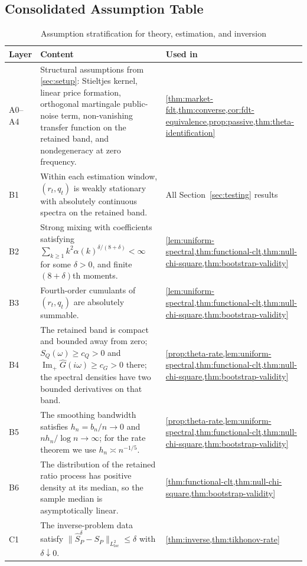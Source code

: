 \documentclass[11pt]{article}
\newcommand{\Ghat}{\widehat{G}}
\newcommand{\ImPart}{\operatorname{Im}_{\!+}}
\newcommand{\REV}{}
\begin{document}
\subsection{Consolidated Assumption Table}
\REV
\begin{table}[t]
\centering
\caption{Assumption stratification for theory, estimation, and inversion}
\begin{tabular}{>{\raggedright\arraybackslash}p{} >{\raggedright\arraybackslash}p{} >{\raggedright\arraybackslash}p{}}
\toprule
Layer & Content & Used in \\
\midrule
A0--A4 & Structural assumptions from \cref{sec:setup}: Stieltjes kernel, linear price formation, orthogonal martingale public-noise term, non-vanishing transfer function on the retained band, and nondegeneracy at zero frequency. & \cref{thm:market-fdt,thm:converse,cor:fdt-equivalence,prop:passive,thm:theta-identification} \\
B1 & Within each estimation window, $(r_t,q_t)$ is weakly stationary with absolutely continuous spectra on the retained band. & All Section~\ref{sec:testing} results \\
B2 & Strong mixing with coefficients satisfying $\sum_{k\ge 1} k^2\alpha(k)^{\delta/(8+\delta)}<\infty$ for some $\delta>0$, and finite $(8+\delta)$th moments. & \cref{lem:uniform-spectral,thm:functional-clt,thm:null-chi-square,thm:bootstrap-validity} \\
B3 & Fourth-order cumulants of $(r_t,q_t)$ are absolutely summable. & \cref{lem:uniform-spectral,thm:functional-clt,thm:null-chi-square,thm:bootstrap-validity} \\
B4 & The retained band is compact and bounded away from zero; $S_Q(\omega)\ge c_Q>0$ and $\ImPart\Ghat(i\omega)\ge c_G>0$ there; the spectral densities have two bounded derivatives on that band. & \cref{prop:theta-rate,lem:uniform-spectral,thm:functional-clt,thm:null-chi-square,thm:bootstrap-validity} \\
B5 & The smoothing bandwidth satisfies $h_n=b_n/n\to 0$ and $n h_n/\log n\to\infty$; for the rate theorem we use $h_n\asymp n^{-1/5}$. & \cref{prop:theta-rate,lem:uniform-spectral,thm:functional-clt,thm:null-chi-square,thm:bootstrap-validity} \\
B6 & The distribution of the retained ratio process has positive density at its median, so the sample median is asymptotically linear. & \cref{thm:functional-clt,thm:null-chi-square,thm:bootstrap-validity} \\
C1 & The inverse-problem data satisfy $\|\widehat S_P^\delta-S_P\|_{L^2_{\mathrm{loc}}}\le \delta$ with $\delta\downarrow 0$. & \cref{thm:inverse,thm:tikhonov-rate} \\

\end{tabular}
\end{table}
\end{document}

